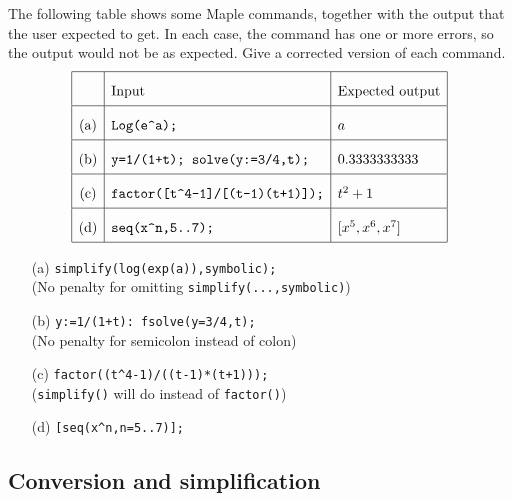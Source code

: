 \documentclass[a4paper]{article}
\begin{document}
\begin{problem}
 The following table shows some Maple commands, together
 with the output that the user expected to get.  In each
 case, the command has one or more errors, so the output
 would not be as expected.  Give a corrected version of each
 command.   
 \[ \renewcommand{\arraystretch}{2}
    \begin{array}{|c|l|l|}
     \hline
      & \mbox{Input} & \mbox{Expected output} \\ \hline
      \mbox{(a)} &
      \verb~Log(e^a);~ &
      a \\ \hline
      \mbox{(b)} &
      \verb~y=1/(1+t); solve(y:=3/4,t);~ &
      0.3333333333 \\ \hline
      \mbox{(c)} &
      \verb~factor([t^4-1]/[(t-1)(t+1)]);~ &
      t^2+1 \\ \hline
      \mbox{(d)} &
      \verb~seq(x^n,5..7);~ &
      [x^5,x^6,x^7] \\ \hline
    \end{array}
 \]
\end{problem}
\begin{solution}
 \begin{itemize}
  \item[(a)] \verb~simplify(log(exp(a)),symbolic);~
   \hspace{2em}\\
   (No penalty for omitting \verb~simplify(...,symbolic)~)
  \item[(b)] \verb~y:=1/(1+t): fsolve(y=3/4,t);~ \hspace{2em}\\
   (No penalty for semicolon instead of colon)
  \item[(c)] \verb~factor((t^4-1)/((t-1)*(t+1)));~ \hspace{2em}\\
   (\verb~simplify()~ will do instead of \verb~factor()~)
  \item[(d)] \verb~[seq(x^n,n=5..7)];~         \hspace{2em}
 \end{itemize}
\end{solution}

\subsection{Conversion and simplification}
\end{document}
